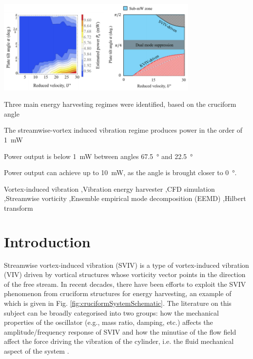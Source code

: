 \documentclass[a4paper,fleqn]{cas-sc}
\begin{document}
\begin{graphicalabstract}
  \includegraphics[width=0.75\textwidth]{figs/graphicalAbstract}
\end{graphicalabstract}


\begin{highlights}
\item Three main energy harvesting regimes were identified, based on the cruciform angle
\item The streamwise-vortex induced vibration regime produces power in the order of \SI{1}{\milli\watt}
\item Power output is below \SI{1}{\milli\watt} between angles \SI{67.5}{\degree} and \SI{22.5}{\degree}
\item Power output can achieve up to \SI{10}{\milli\watt}, as the angle is brought closer to \SI{0}{\degree}.
\end{highlights}

\begin{keywords}
  Vortex-induced vibration \sep Vibration energy harvester \sep CFD simulation \sep Streamwise vorticity \sep Ensemble empirical mode decomposition (EEMD) \sep Hilbert transform
\end{keywords}


\maketitle

\doublespacing

\section{Introduction} \label{sec:intro}
Streamwise vortex-induced vibration (SVIV) is a type of vortex-induced vibration (VIV) driven by vortical structures whose vorticity vector points in the direction of the free stream. In recent decades, there have been efforts to exploit the SVIV phenomenon from cruciform structures for energy harvesting, an example of which is given in Fig. \ref{fig:cruciformSystemSchematic}. The literature on this subject can be broadly categorised into two groups: how the mechanical properties of the oscillator (e.g., mass ratio, damping, etc.) affects the amplitude/frequency response of SVIV \citep{Koide2009,Koide2013,Nguyen2012} and how the minutiae of the flow field affect the force driving the vibration of the cylinder, i.e. the fluid mechanical aspect of the system \citep{Deng2007,Koide2017,Zhao2018a}.
\end{document}
